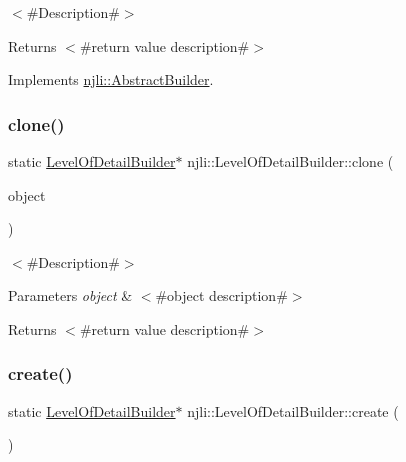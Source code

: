$<$\#\+Description\#$>$

\begin{DoxyReturn}{Returns}
$<$\#return value description\#$>$ 
\end{DoxyReturn}


Implements \mbox{\hyperlink{classnjli_1_1_abstract_builder_aa1d220053e182c37b31b427499c6eacf}{njli\+::\+Abstract\+Builder}}.

\mbox{\label{classnjli_1_1_level_of_detail_builder_a63db1f2fc7d0bfd57f4d26ed5bd29247}} 
\subsubsection{\texorpdfstring{clone()}{clone()}}
{\footnotesize\ttfamily static \mbox{\hyperlink{classnjli_1_1_level_of_detail_builder}{Level\+Of\+Detail\+Builder}}$\ast$ njli\+::\+Level\+Of\+Detail\+Builder\+::clone (\begin{DoxyParamCaption}\item[{const \mbox{\hyperlink{classnjli_1_1_level_of_detail_builder}{Level\+Of\+Detail\+Builder}} \&}]{object }\end{DoxyParamCaption})\hspace{0.3cm}{\ttfamily [static]}}

$<$\#\+Description\#$>$


\begin{DoxyParams}{Parameters}
{\em object} & $<$\#object description\#$>$\\
\hline
\end{DoxyParams}
\begin{DoxyReturn}{Returns}
$<$\#return value description\#$>$ 
\end{DoxyReturn}
\mbox{\label{classnjli_1_1_level_of_detail_builder_aa20b31e8de26f34163724d3ce3184849}} 
\subsubsection{\texorpdfstring{create()}{create()}}
{\footnotesize\ttfamily static \mbox{\hyperlink{classnjli_1_1_level_of_detail_builder}{Level\+Of\+Detail\+Builder}}$\ast$ njli\+::\+Level\+Of\+Detail\+Builder\+::create (\begin{DoxyParamCaption}{ }\end{DoxyParamCaption})\hspace{0.3cm}{\ttfamily [static]}}

